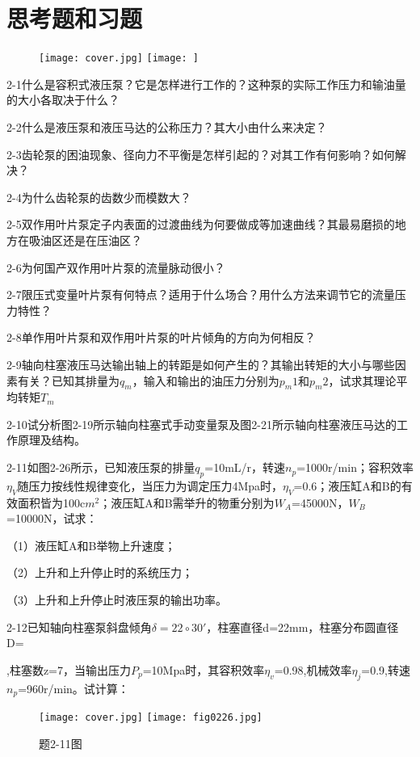 
\section{思考题和习题}

\begin{figure}
\ifOpenSource
\texttt{[image: cover.jpg]}
\else
\texttt{[image: ]}
\fi
\caption{}
\label{}
\end{figure}
    

2-1什么是容积式液压泵？它是怎样进行工作的？这种泵的实际工作压力和输油量的大小各取决于什么？

2-2什么是液压泵和液压马达的公称压力？其大小由什么来决定？

2-3齿轮泵的困油现象、径向力不平衡是怎样引起的？对其工作有何影响？如何解决？

2-4为什么齿轮泵的齿数少而模数大？

2-5双作用叶片泵定子内表面的过渡曲线为何要做成等加速曲线？其最易磨损的地方在吸油区还是在压油区？

2-6为何国产双作用叶片泵的流量脉动很小？

2-7限压式变量叶片泵有何特点？适用于什么场合？用什么方法来调节它的流量压力特性？

2-8单作用叶片泵和双作用叶片泵的叶片倾角的方向为何相反？

2-9轴向柱塞液压马达输出轴上的转距是如何产生的？其输出转矩的大小与哪些因素有关？已知其排量为$q_m$，输入和输出的油压力分别为$p_m1$和$p_m2$，试求其理论平均转矩$T_m$

2-10试分析图2-19所示轴向柱塞式手动变量泵及图2-21所示轴向柱塞液压马达的工作原理及结构。

2-11如图2-26所示，已知液压泵的排量$q_p$=10mL/r，转速$n_p$=1000r/min；容积效率$\eta_V$随压力按线性规律变化，当压力为调定压力4Mpa时，$\eta_V$=0.6；液压缸A和B的有效面积皆为100c$m^2$；液压缸A和B需举升的物重分别为$W_A$=45000N，$W_B$=10000N，试求：

（1）液压缸A和B举物上升速度；

（2）上升和上升停止时的系统压力；

（3）上升和上升停止时液压泵的输出功率。

2-12已知轴向柱塞泵斜盘倾角$\delta =22\circ30'$，柱塞直径d=22mm，柱塞分布圆直径D=

\newpage
\noindent
68mm,柱塞数z=7，当输出压力$P_p$=10Mpa时，其容积效率$\eta_v$=0.98,机械效率$\eta_j$=0.9,转速$n_p$=960r/min。试计算：

\begin{figure} [htbp]
    \centering
    \ifOpenSource
    \texttt{[image: cover.jpg]}
    \else
    \texttt{[image: fig0226.jpg]}
    \fi
    \caption{题2-11图} 
    \label{fig:fig0226}
\end{figure}



